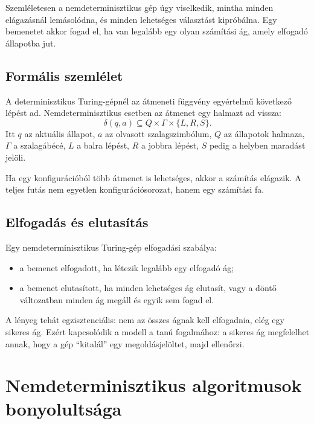 Szemléletesen a nemdeterminisztikus gép úgy viselkedik, mintha minden elágazásnál lemásolódna, és minden lehetséges választást kipróbálna. Egy bemenetet akkor fogad el, ha van legalább egy olyan számítási ág, amely elfogadó állapotba jut.

\subsection{Formális szemlélet}

A determinisztikus Turing-gépnél az átmeneti függvény egyértelmű következő lépést ad. Nemdeterminisztikus esetben az átmenet egy halmazt ad vissza:
\[
  \delta(q,a)\subseteq Q\times\Gamma\times\{L,R,S\}.
\]
Itt $q$ az aktuális állapot, $a$ az olvasott szalagszimbólum, $Q$ az állapotok halmaza, $\Gamma$ a szalagábécé, $L$ a balra lépést, $R$ a jobbra lépést, $S$ pedig a helyben maradást jelöli.

Ha egy konfigurációból több átmenet is lehetséges, akkor a számítás elágazik. A teljes futás nem egyetlen konfigurációsorozat, hanem egy számítási fa.



\subsection{Elfogadás és elutasítás}

Egy nemdeterminisztikus Turing-gép elfogadási szabálya:

\begin{itemize}
  \item a bemenet elfogadott, ha létezik legalább egy elfogadó ág;
  \item a bemenet elutasított, ha minden lehetséges ág elutasít, vagy a döntő változatban minden ág megáll és egyik sem fogad el.
\end{itemize}

A lényeg tehát egzisztenciális: nem az összes ágnak kell elfogadnia, elég egy sikeres ág. Ezért kapcsolódik a modell a tanú fogalmához: a sikeres ág megfelelhet annak, hogy a gép ``kitalál'' egy megoldásjelöltet, majd ellenőrzi.


\section{Nemdeterminisztikus algoritmusok bonyolultsága}

